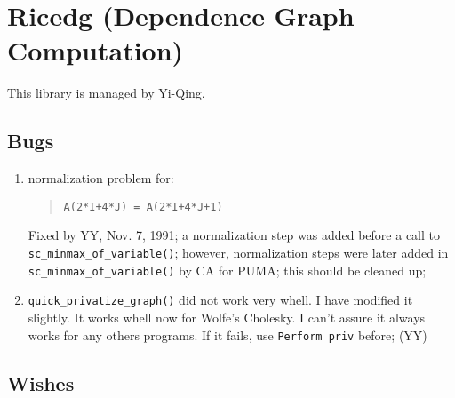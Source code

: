 \newpage
\section{Ricedg (Dependence Graph Computation)}

This library is managed by Yi-Qing.

\subsection{Bugs}

\begin{enumerate}

  \item {} normalization problem for:
	\begin{quote}
\begin{verbatim}
A(2*I+4*J) = A(2*I+4*J+1)
\end{verbatim}
	\end{quote}
	Fixed by YY, Nov. 7, 1991; a normalization step was added before
	a call to \verb+sc_minmax_of_variable()+; 
	however, normalization steps
	were later added in \verb+sc_minmax_of_variable()+ by CA for PUMA;
	this should be cleaned up;
  \item \verb+quick_privatize_graph()+ did not work very whell. I have
modified it slightly. It works whell now for Wolfe's Cholesky. I can't assure
it always works for any others programs. If it fails, use
\verb+Perform priv+ before; (YY)

\end{enumerate}

\subsection{Wishes}

